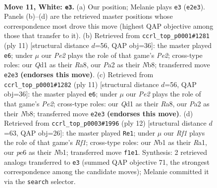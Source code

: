 \documentclass[11pt]{article}
\begin{document}
\clearpage

\begin{figure}[p]\centering
\begin{subfigure}{0.46\textwidth}\centering
\resizebox{\linewidth}{!}{%
\newchessgame
\chessboard[
  setfen={rnbqrk2/pp1nbppp/4p3/2p5/2Pp2P1/1P3N1B/P2PPP1P/RNBQ1RK1 w - - 3 11},
  showmover=false,
  pgfstyle=straightmove, color=movearrow, markmove={e2-e3}
]}
\caption{}
\end{subfigure}\hfill
\begin{subfigure}{0.46\textwidth}\centering
\resizebox{\linewidth}{!}{%
\newchessgame
\chessboard[
  setfen={rnbq1rk1/pp1pppbp/5np1/2pP4/2P5/4PN2/PP2BPPP/RNBQK2R b KQ - 0 6},
  showmover=false,
  pgfstyle=straightmove, color=movearrow, markmove={e7-e6}
]}
\caption{}
\end{subfigure}
\\[4pt]
\begin{subfigure}{0.46\textwidth}\centering
\resizebox{\linewidth}{!}{%
\newchessgame
\chessboard[
  setfen={rnbq1rk1/pp1pppbp/5np1/2pP4/2P5/4PN2/PP2BPPP/RNBQK2R b KQ - 0 6},
  showmover=false,
  pgfstyle=straightmove, color=movearrow, markmove={e7-e6}
]}
\caption{}
\end{subfigure}\hfill
\begin{subfigure}{0.46\textwidth}\centering
\resizebox{\linewidth}{!}{%
\newchessgame
\chessboard[
  setfen={r2qkb1r/pp1b1ppp/2nppn2/2p5/4P3/2PB1N1P/PP1P1PP1/RNBQ1RK1 w kq - 0 7},
  showmover=false,
  pgfstyle=straightmove, color=movearrow, markmove={f1-e1}
]}
\caption{}
\end{subfigure}
\caption{\textbf{Move 11, White: \texttt{e3}.} (a) Our position; Melanie plays \texttt{e3} (\texttt{e2e3}). Panels (b)--(d) are the retrieved master positions whose correspondence most drove this move (highest QAP objective among those that transfer to it). (b) Retrieved from \texttt{ccrl\_top\_p0001\#1281} (ply 11) [structural distance $d$=56, QAP obj=36]: the master played \texttt{e6}; under $\mu$ our \emph{Pe2} plays the role of that game's \emph{Pe2}; cross-type roles: our \emph{Q}d1 as their \emph{R}a8, our \emph{P}a2 as their \emph{N}b8; transferred move \texttt{e2e3} \textbf{(endorses this move)}. (c) Retrieved from \texttt{ccrl\_top\_p0001\#1282} (ply 11) [structural distance $d$=56, QAP obj=36]: the master played \texttt{e6}; under $\mu$ our \emph{Pe2} plays the role of that game's \emph{Pe2}; cross-type roles: our \emph{Q}d1 as their \emph{R}a8, our \emph{P}a2 as their \emph{N}b8; transferred move \texttt{e2e3} \textbf{(endorses this move)}. (d) Retrieved from \texttt{ccrl\_top\_p0003\#1996} (ply 12) [structural distance $d$=63, QAP obj=26]: the master played \texttt{Re1}; under $\mu$ our \emph{Rf1} plays the role of that game's \emph{Rf1}; cross-type roles: our \emph{N}b1 as their \emph{R}a1, our \emph{p}e6 as their \emph{N}b1; transferred move \texttt{f1e1}. Synthesis: 2 retrieved analogs transferred to \texttt{e3} (summed QAP objective 71, the strongest correspondence among the candidate moves); Melanie committed it via the \texttt{search} selector.}
\label{fig:thought-m20}
\end{figure}
\end{document}
